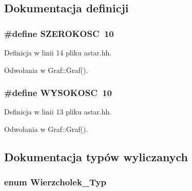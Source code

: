 \subsection{\-Dokumentacja definicji}
\hypertarget{astar_8hh_acd0b90760065a9ea20a0bf6e9f01289c}{
\subsubsection[{\-S\-Z\-E\-R\-O\-K\-O\-S\-C}]{\setlength{\rightskip}{0pt plus 5cm}\#define {\bf \-S\-Z\-E\-R\-O\-K\-O\-S\-C}~10}}\label{astar_8hh_acd0b90760065a9ea20a0bf6e9f01289c}


\-Definicja w linii 14 pliku astar.\-hh.



\-Odwołania w \-Graf\-::\-Graf().

\hypertarget{astar_8hh_a771583e9e87d083150a9a329f44c5f7e}{
\subsubsection[{\-W\-Y\-S\-O\-K\-O\-S\-C}]{\setlength{\rightskip}{0pt plus 5cm}\#define {\bf \-W\-Y\-S\-O\-K\-O\-S\-C}~10}}\label{astar_8hh_a771583e9e87d083150a9a329f44c5f7e}


\-Definicja w linii 13 pliku astar.\-hh.



\-Odwołania w \-Graf\-::\-Graf().



\subsection{\-Dokumentacja typów wyliczanych}
\hypertarget{astar_8hh_af54d448689b4613c3715929ca2a914a2}{
\subsubsection[{\-Wierzcholek\-\_\-\-Typ}]{\setlength{\rightskip}{0pt plus 5cm}enum {\bf \-Wierzcholek\-\_\-\-Typ}}}\label{astar_8hh_af54d448689b4613c3715929ca2a914a2}


